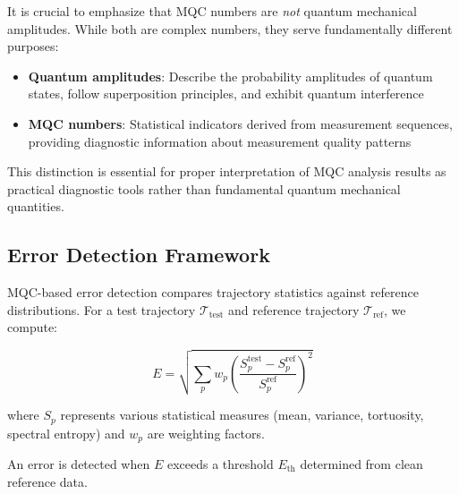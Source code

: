 It is crucial to emphasize that MQC numbers are \emph{not} quantum mechanical amplitudes. While both are complex numbers, they serve fundamentally different purposes:

\begin{itemize}
\item \textbf{Quantum amplitudes}: Describe the probability amplitudes of quantum states, follow superposition principles, and exhibit quantum interference
\item \textbf{MQC numbers}: Statistical indicators derived from measurement sequences, providing diagnostic information about measurement quality patterns
\end{itemize}

This distinction is essential for proper interpretation of MQC analysis results as practical diagnostic tools rather than fundamental quantum mechanical quantities.

\subsection{Error Detection Framework}

MQC-based error detection compares trajectory statistics against reference distributions. For a test trajectory $\mathcal{T}_{\text{test}}$ and reference trajectory $\mathcal{T}_{\text{ref}}$, we compute:

\begin{equation}
E = \sqrt{\sum_{p} w_p \left(\frac{S_p^{\text{test}} - S_p^{\text{ref}}}{S_p^{\text{ref}}}\right)^2}
\label{eq:error_metric}
\end{equation}

where $S_p$ represents various statistical measures (mean, variance, tortuosity, spectral entropy) and $w_p$ are weighting factors.

An error is detected when $E$ exceeds a threshold $E_{\text{th}}$ determined from clean reference data.